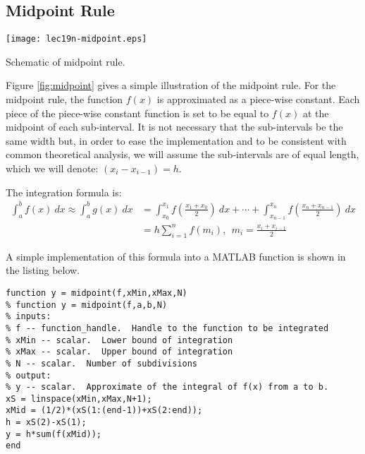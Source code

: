 \subsection{Midpoint Rule}
 
 \begin{marginfigure}
 \texttt{[image: lec19n-midpoint.eps]}
 \caption{Schematic of midpoint rule.}
 \label{fig:midpoint}
 \end{marginfigure}
 
 Figure \ref{fig:midpoint} gives a simple illustration of the midpoint rule.  For the midpoint rule, the function $f(x)$ is approximated as a piece-wise constant.  Each piece of the piece-wise constant function is set to be equal to $f(x)$ at the midpoint of each sub-interval.  It is not necessary that the sub-intervals be the same width but, in order to ease the implementation and to be consistent with common theoretical analysis, we will assume the sub-intervals are of equal length, which we will denote: $(x_i - x_{i-1})=h$.
 
 The integration formula is:
 \begin{align*}
 \int_{a}^{b} f(x) \ dx \approx \int_{a}^{b} g(x) \ dx &= \int_{x_0}^{x_1}f\left(\frac{x_1 + x_0}{2}\right) \ dx + \cdots + \int_{x_{n-1}}^{x_n}f\left(\frac{x_n + x_{n-1}}{2} \right) \ dx \\
 &= h \sum\limits_{i=1}^{n} f(m_i), \ \ m_i = \frac{x_i+x_{i-1}}{2} 
 \end{align*}
 
 A simple implementation of this formula into a MATLAB function is shown in the listing below.
 \begin{lstlisting}[style=myMatlab,name=lec19n-midpoint]
 function y = midpoint(f,xMin,xMax,N)
% function y = midpoint(f,a,b,N)
% inputs:
% f -- function_handle.  Handle to the function to be integrated
% xMin -- scalar.  Lower bound of integration
% xMax -- scalar.  Upper bound of integration
% N -- scalar.  Number of subdivisions
% output:
% y -- scalar.  Approximate of the integral of f(x) from a to b.
xS = linspace(xMin,xMax,N+1);
xMid = (1/2)*(xS(1:(end-1))+xS(2:end));
h = xS(2)-xS(1);
y = h*sum(f(xMid));
end
 \end{lstlisting}
 
